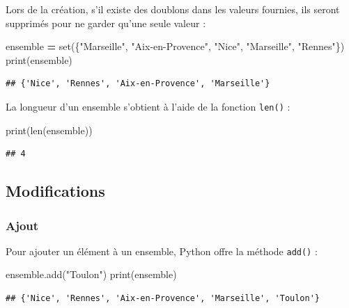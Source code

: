 \documentclass[12pt,]{book}
\newenvironment{Shaded}{\begin{snugshade}}{\end{snugshade}}
\newcommand{\StringTok}[1]{\textcolor[rgb]{0.31,0.60,0.02}{#1}}
\newcommand{\OperatorTok}[1]{\textcolor[rgb]{0.81,0.36,0.00}{\textbf{#1}}}
\newcommand{\BuiltInTok}[1]{#1}
\newcommand{\NormalTok}[1]{#1}
\numberwithin{equation}{section}
\numberwithin{countremarque}{section}
\begin{document}
Lors de la création, s'il existe des doublons dans les valeurs fournies,
ils seront supprimés pour ne garder qu'une seule valeur :

\begin{Shaded}
\begin{Highlighting}[]
\NormalTok{ensemble }\OperatorTok{=} \BuiltInTok{set}\NormalTok{(\{}\StringTok{"Marseille"}\NormalTok{, }\StringTok{"Aix-en-Provence"}\NormalTok{, }\StringTok{"Nice"}\NormalTok{, }\StringTok{"Marseille"}\NormalTok{, }\StringTok{"Rennes"}\NormalTok{\})}
\BuiltInTok{print}\NormalTok{(ensemble)}
\end{Highlighting}
\end{Shaded}

\begin{lstlisting}
## {'Nice', 'Rennes', 'Aix-en-Provence', 'Marseille'}
\end{lstlisting}

La longueur d'un ensemble s'obtient à l'aide de la fonction
\texttt{len()} :

\begin{Shaded}
\begin{Highlighting}[]
\BuiltInTok{print}\NormalTok{(}\BuiltInTok{len}\NormalTok{(ensemble))}
\end{Highlighting}
\end{Shaded}

\begin{lstlisting}
## 4
\end{lstlisting}

\subsection{Modifications}\label{modifications}

\subsubsection{Ajout}\label{ajout}

Pour ajouter un élément à un ensemble, Python offre la méthode
\texttt{add()} :

\begin{Shaded}
\begin{Highlighting}[]
\NormalTok{ensemble.add(}\StringTok{"Toulon"}\NormalTok{)}
\BuiltInTok{print}\NormalTok{(ensemble)}
\end{Highlighting}
\end{Shaded}

\begin{lstlisting}
## {'Nice', 'Rennes', 'Aix-en-Provence', 'Marseille', 'Toulon'}
\end{lstlisting}
\end{document}
